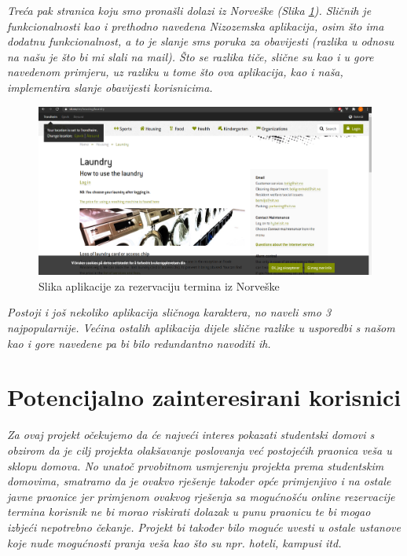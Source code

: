			\textit{Treća pak stranica koju smo pronašli dolazi iz Norveške (Slika  \ref{fig:sit}). Sličnih je funkcionalnosti kao i prethodno
			navedena Nizozemska aplikacija, osim što ima dodatnu funkcionalnost, a to je slanje sms poruka za
			obavijesti (razlika u odnosu na našu je što bi mi slali na mail). Što se razlika tiče, slične su kao i u gore
			navedenom primjeru, uz razliku u tome što ova aplikacija, kao i naša, implementira slanje obavijesti
			korisnicima. }
		
			\begin{figure}[H]
				\includegraphics[width=.9\linewidth]{slike/SIT.PNG}
				\caption{Slika aplikacije za rezervaciju termina iz Norveške}
				\label{fig:sit}
			\end{figure}
		
			\textit{Postoji i još nekoliko aplikacija sličnoga karaktera, no naveli smo 3 najpopularnije. Većina ostalih
			aplikacija dijele slične razlike u usporedbi s našom kao i gore navedene pa bi bilo redundantno navoditi
			ih.}
			
		\section{Potencijalno zainteresirani korisnici}
			
			\textit{Za ovaj projekt očekujemo da će najveći interes pokazati studentski domovi s obzirom da je cilj projekta
			olakšavanje poslovanja već postojećih praonica veša u sklopu domova. No unatoč prvobitnom
			usmjerenju projekta prema studentskim domovima, smatramo da je ovakvo rješenje također opće
			primjenjivo i na ostale javne praonice jer primjenom ovakvog rješenja sa mogućnošću online rezervacije
			termina korisnik ne bi morao riskirati dolazak u punu praonicu te bi mogao izbjeći nepotrebno čekanje.
			Projekt bi također bilo moguće uvesti u ostale ustanove koje nude mogućnosti pranja veša kao što su
			npr. hoteli, kampusi itd.}	
		
